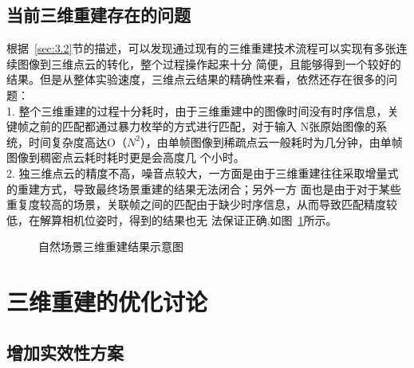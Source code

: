 \subsection{当前三维重建存在的问题}
\label{sec:3.2.3}
根据~\ref{sec:3.2}节的描述，可以发现通过现有的三维重建技术流程可以实现有多张连续图像到三维点云的转化，整个过程操作起来十分
简便，且能够得到一个较好的结果。但是从整体实验速度，三维点云结果的精确性来看，依然还存在很多的问题：\\
1. 整个三维重建的过程十分耗时，由于三维重建中的图像时间没有时序信息，关键帧之前的匹配都通过暴力枚举的方式进行匹配，对于输入
N张原始图像的系统，时间复杂度高达O（$N^2$），由单帧图像到稀疏点云一般耗时为几分钟，由单帧图像到稠密点云耗时耗时更是会高度几
个小时。\\
2. 独三维点云的精度不高，噪音点较大，一方面是由于三维重建往往采取增量式的重建方式，导致最终场景重建的结果无法闭合；另外一方
面也是由于对于某些重复度较高的场景，关联帧之间的匹配由于缺少时序信息，从而导致匹配精度较低，在解算相机位姿时，得到的结果也无
法保证正确,如图~\ref{fig:chap2:3dconstr_stone}所示。
\begin{figure}[htbp]
  \centering
  \vskip0.5cm
  \caption{自然场景三维重建结果示意图}\label{fig:chap2:3dconstr_stone}
\end{figure}
\section{三维重建的优化讨论}
\label{sec:3.3}
\subsection{增加实效性方案}
\label{sec:3.3.1}



